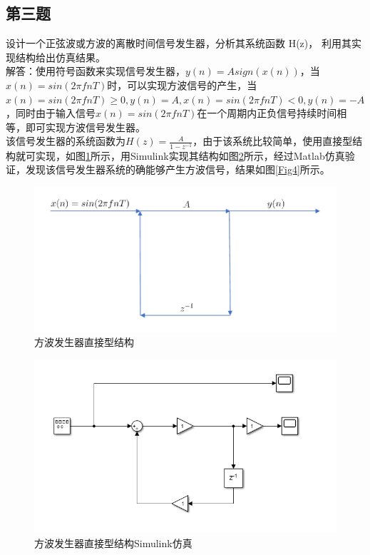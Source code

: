 \documentclass{seuer}
\begin{document}
\subsection{第三题}
设计一个正弦波或方波的离散时间信号发生器，分析其系统函数 H(z)，
利用其实现结构给出仿真结果。
\\解答：使用符号函数来实现信号发生器，$y(n)=Asign(x(n))$，当$x(n)=sin(2\pi fnT)$时，可以实现方波信号的产生，当$x(n)=sin(2\pi fnT)\ge0, y(n)=A,x(n)=sin(2\pi fnT)<0, y(n)=-A$，同时由于输入信号$x(n)=sin(2\pi fnT)$在一个周期内正负信号持续时间相等，即可实现方波信号发生器。
\\该信号发生器的系统函数为$H(z)=\frac{A}{1-z^{-1}}$，由于该系统比较简单，使用直接型结构就可实现，如图\ref{Fig3}所示，用Simulink实现其结构如图\ref{simulink}所示，经过Matlab仿真验证，发现该信号发生器系统的确能够产生方波信号，结果如图\ref{Fig4}所示。
\begin{figure}[H] %
	\centering %
	\includegraphics[width=1\textwidth]{"符号函数.pdf"} %
	\caption{方波发生器直接型结构} %
	\label{Fig3} %
\end{figure}
\begin{figure}[H] %
	\centering %
	\includegraphics[width=1\textwidth]{"../DSPAssignment/方法发生器simulink.png"} %
	\caption{方波发生器直接型结构Simulink仿真} %
	\label{simulink} %
\end{figure}
\end{document}
